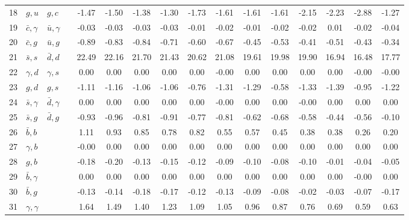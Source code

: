 \begin{tabularx}{\textwidth}{rXXX@{}S@{}S@{}S@{}S@{}S@{}S@{}S@{}S@{}S@{}S@{}S@{}S}
 18 & $g,u$            & $g,c$            &                 & -1.47 & -1.50 & -1.38 & -1.30 & -1.73 & -1.61 & -1.61 & -1.61 & -2.15 & -2.23 & -2.88 & -1.27 \\
 19 & $\bar c,\gamma$  & $\bar u,\gamma$  &                 & -0.03 & -0.03 & -0.03 & -0.03 & -0.01 & -0.02 & -0.01 & -0.02 & -0.02 &  0.01 & -0.02 & -0.04 \\
 20 & $\bar c, g$      & $\bar u, g$      &                 & -0.89 & -0.83 & -0.84 & -0.71 & -0.60 & -0.67 & -0.45 & -0.53 & -0.41 & -0.51 & -0.43 & -0.34 \\
 21 & $\bar s, s$      & $\bar d, d$      &                 & 22.49 & 22.16 & 21.70 & 21.43 & 20.62 & 21.08 & 19.61 & 19.98 & 19.90 & 16.94 & 16.48 & 17.77 \\
 22 & $\gamma, d$      & $\gamma, s$      &                 &  0.00 &  0.00 &  0.00 &  0.00 &  0.00 & -0.00 &  0.00 &  0.00 &  0.00 &  0.00 & -0.00 & -0.00 \\
 23 & $g,d$            & $g,s$            &                 & -1.11 & -1.16 & -1.06 & -1.06 & -0.76 & -1.31 & -1.29 & -0.58 & -1.33 & -1.39 & -0.95 & -1.22 \\
 24 & $\bar s,\gamma$  & $\bar d,\gamma$  &                 &  0.00 &  0.00 &  0.00 &  0.00 &  0.00 & -0.00 &  0.00 &  0.00 & -0.00 &  0.00 &  0.00 &  0.00 \\
 25 & $\bar s,g$       & $\bar d, g$      &                 & -0.93 & -0.96 & -0.81 & -0.91 & -0.77 & -0.81 & -0.62 & -0.68 & -0.58 & -0.44 & -0.56 & -0.10 \\
 26 & $\bar b,b$       &                  &                 &  1.11 &  0.93 &  0.85 &  0.78 &  0.82 &  0.55 &  0.57 &  0.45 &  0.38 &  0.38 &  0.26 &  0.20 \\
 27 & $\gamma, b$      &                  &                 & -0.00 &  0.00 &  0.00 &  0.00 &  0.00 &  0.00 &  0.00 &  0.00 &  0.00 &  0.00 &  0.00 &  0.00 \\
 28 & $g,b$            &                  &                 & -0.18 & -0.20 & -0.13 & -0.15 & -0.12 & -0.09 & -0.10 & -0.08 & -0.10 & -0.01 & -0.04 & -0.05 \\
 29 & $\bar b,\gamma$  &                  &                 &  0.00 &  0.00 &  0.00 &  0.00 &  0.00 &  0.00 &  0.00 &  0.00 &  0.00 &  0.00 & -0.00 &  0.00 \\
 30 & $\bar b,g$       &                  &                 & -0.13 & -0.14 & -0.18 & -0.17 & -0.12 & -0.13 & -0.09 & -0.08 & -0.02 & -0.03 & -0.07 & -0.17 \\
 31 & $\gamma,\gamma$  &                  &                 &  1.64 &  1.49 &  1.40 &  1.23 &  1.09 &  1.05 &  0.96 &  0.87 &  0.76 &  0.69 &  0.59 &  0.63 \\

\end{tabularx}
